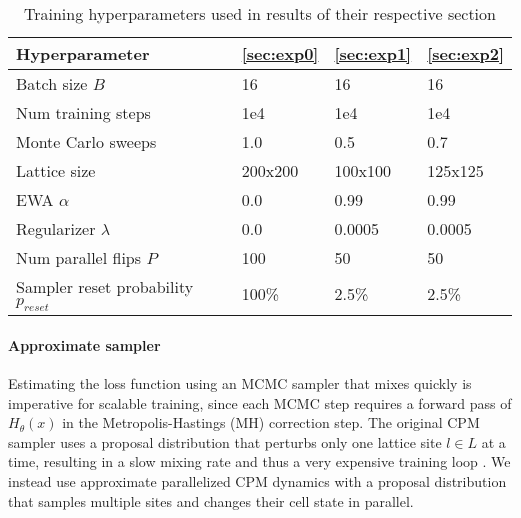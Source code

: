 \begin{table}[h]
\centering
\caption{Training hyperparameters used in results of their respective section}
\vskip 0.15in
\label{tbl:hyperparameters}
\begin{tabular}{|l|l|l|l|} \hline
\textbf{Hyperparameter}                     & \ref{sec:exp0}     & \ref{sec:exp1}     & \ref{sec:exp2}     \\ \hline
Batch size $B$                     & 16      & 16      & 16      \\\hline
Num training steps                 & 1e4     & 1e4     & 1e4     \\\hline
Monte Carlo sweeps                 & 1.0     & 0.5     & 0.7     \\\hline
Lattice size                          & 200x200 & 100x100 & 125x125 \\\hline
EWA $\alpha$          & 0.0     & 0.99    & 0.99    \\\hline
Regularizer $\lambda$ & 0.0     & 0.0005  & 0.0005  \\\hline
Num parallel flips $P$                 & 100     & 50      & 50     \\ \hline
Sampler reset probability $p_{reset}$ & 100\% & 2.5\% & 2.5\% \\ \hline
\end{tabular}
\end{table}

\paragraph{Approximate sampler}
Estimating the loss function using an MCMC sampler that mixes quickly is imperative for scalable training, since each MCMC step requires a forward pass of $H_\theta(x)$ in the Metropolis-Hastings (MH) correction step. 
The original CPM sampler uses a proposal distribution that perturbs only one lattice site $l \in L$ at a time, resulting in a slow mixing rate and thus a very expensive training loop \cite{Graner1992}. We instead use approximate parallelized CPM dynamics with a proposal distribution that samples multiple sites and changes their cell state in parallel.

